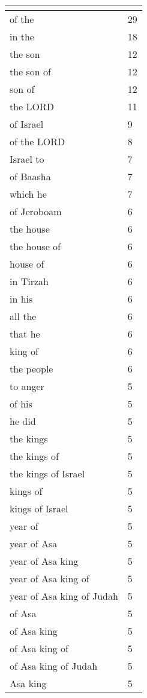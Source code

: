 \begin{center}
\begin{longtable}{|p{3.0in}|p{0.5in}|}
\hline \multicolumn{2}{c}{{ }} \\ \hline
\endfoot 
of the & 29\\ \hline 
in the & 18\\ \hline 
the son & 12\\ \hline 
the son of & 12\\ \hline 
son of & 12\\ \hline 
the LORD & 11\\ \hline 
of Israel & 9\\ \hline 
of the LORD & 8\\ \hline 
Israel to & 7\\ \hline 
of Baasha & 7\\ \hline 
which he & 7\\ \hline 
of Jeroboam & 6\\ \hline 
the house & 6\\ \hline 
the house of & 6\\ \hline 
house of & 6\\ \hline 
in Tirzah & 6\\ \hline 
in his & 6\\ \hline 
all the & 6\\ \hline 
that he & 6\\ \hline 
king of & 6\\ \hline 
the people & 6\\ \hline 
to anger & 5\\ \hline 
of his & 5\\ \hline 
he did & 5\\ \hline 
the kings & 5\\ \hline 
the kings of & 5\\ \hline 
the kings of Israel & 5\\ \hline 
kings of & 5\\ \hline 
kings of Israel & 5\\ \hline 
year of & 5\\ \hline 
year of Asa & 5\\ \hline 
year of Asa king & 5\\ \hline 
year of Asa king of & 5\\ \hline 
year of Asa king of Judah & 5\\ \hline 
of Asa & 5\\ \hline 
of Asa king & 5\\ \hline 
of Asa king of & 5\\ \hline 
of Asa king of Judah & 5\\ \hline 
Asa king & 5\\ \hline 

\end{longtable}
\end{center}
